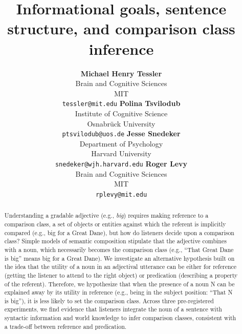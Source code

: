 \documentclass[10pt,letterpaper]{article}
\title{Informational goals, sentence structure, and comparison class inference}
\author{{\large \bf Michael Henry Tessler}  \\  Brain and Cognitive Sciences \\   MIT  \\  \texttt{tessler@mit.edu}
         \And  
         {\large \bf Polina Tsvilodub}  \\ Institute of Cognitive Science \\   Osnabrück University  \\  \texttt{ptsvilodub@uos.de}
          \And
         {\large \bf Jesse Snedeker}  \\ Department of Psychology \\   Harvard University  \\  \texttt{snedeker@wjh.harvard.edu}
                   \And
         {\large \bf Roger Levy} \\ Brain and Cognitive Sciences \\   MIT  \\  \texttt{rplevy@mit.edu}}
\begin{document}
\maketitle

\begin{abstract}
   
Understanding a gradable adjective (e.g., \emph{big}) requires making reference to a comparison class, a set of objects or entities against which the referent is implicitly compared (e.g., big for a Great Dane), but how do listeners decide upon a comparison class? Simple models of semantic composition stipulate that the adjective combines with a noun, which necessarily becomes the comparison class (e.g., ``That Great Dane is big'' means big for a Great Dane). We investigate an alternative hypothesis built on the idea that the utility of a noun in an adjectival utterance can be either for reference (getting the listener to attend to the right object) or predication (describing a property of the referent). Therefore, we hypothesize that when the presence of a noun N can be explained away by its utility in reference (e.g., being in the subject position: ``That N is big''), it is less likely to set the comparison class. Across three pre-registered experiments, we find evidence that listeners integrate the noun of a sentence with syntactic information and world knowledge to infer comparison classes, consistent with a trade-off between reference and predication. 
 
   
   
\end{abstract}
\end{document}
